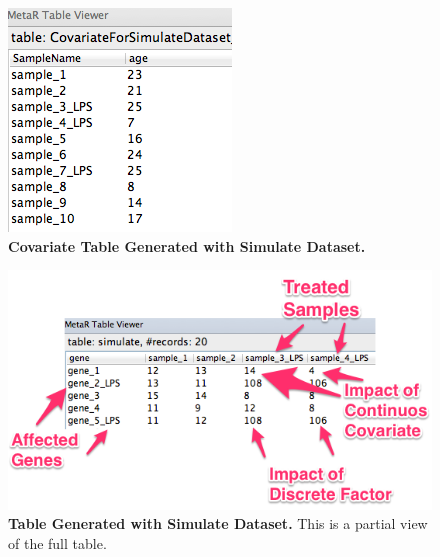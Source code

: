 \begin{figure}[h!tbp]
  \centering
  \includegraphics[width=\figWidthNarrow]{figures/SimulateCovariateTableInspector.png}
\caption[Covariate Table Generated with Simulate Dataset.]{\textbf{Covariate Table Generated with Simulate Dataset.}}
\label{fig:SimulateCovariateTableInspector}
\end{figure}


\begin{figure}[h!tbp]
  \centering
  \includegraphics[width=\figWidthWide]{figures/SimulateTableViewer.png}
\caption[Table Generated with Simulate Dataset.]{\textbf{Table Generated with Simulate Dataset.} This is a partial view of the full table.}
\label{fig:SimulateDatasetViewer}
\end{figure}

